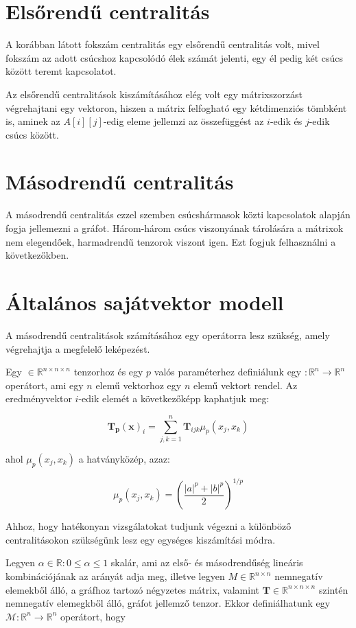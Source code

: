 \documentclass[12pt,numbers=noenddot]{report}
\begin{document}
\section{Elsőrendű centralitás}

A korábban látott fokszám centralitás egy elsőrendű centralitás volt,
mivel fokszám az adott csúcshoz kapcsolódó élek számát jelenti,
egy él pedig két csúcs között teremt kapcsolatot. 

Az elsőrendű centralitások kiszámításához elég volt egy mátrixszorzást 
végrehajtani egy vektoron, hiszen a mátrix felfogható egy kétdimenziós tömbként
is, aminek az $A[i][j]$-edig eleme jellemzi az összefüggést az $i$-edik és 
$j$-edik csúcs között.


\section{Másodrendű centralitás}

A másodrendű centralitás ezzel szemben csúcshármasok közti kapcsolatok alapján 
fogja jellemezni a gráfot. Három-három csúcs viszonyának tárolására a mátrixok 
nem elegendőek, harmadrendű tenzorok viszont igen.
Ezt fogjuk felhasználni a következőkben.


\section{Általános sajátvektor modell}

A másodrendű centralitások számításához egy operátorra lesz szükség, 
amely végrehajtja a megfelelő leképezést.

Egy \unboldmath $\in \mathbb{R}^{n \times n \times n}$ 
tenzorhoz és egy $p$ valós paraméterhez definiálunk egy 
\unboldmath $: \mathbb{R}^n \rightarrow \mathbb{R}^n$ operátort,
ami egy $n$ elemű vektorhoz egy $n$ elemű vektort rendel. 
Az eredményvektor $i$-edik elemét a következőképp kaphatjuk meg:

$$\boldsymbol{T_p}(\boldsymbol{x})_i = \sum_{j,k=1}^n \boldsymbol{T}_{ijk} 
\mu_p(x_j,x_k)$$

ahol $\mu_p(x_j,x_k)$ a hatványközép, azaz:

$$\mu_p(x_j,x_k) = \left(\frac{|a|^p+|b|^p}{2}\right)^{1/p}$$


Ahhoz, hogy hatékonyan vizsgálatokat tudjunk végezni a különböző 
centralitásokon szükségünk lesz egy egységes kiszámítási módra.

Legyen $\alpha \in \mathbb{R}: 0 \leq \alpha \leq 1$ skalár, ami az első- 
és másodrendűség lineáris kombinációjának az arányát adja meg,
illetve legyen $M \in \mathbb{R}^{n \times n}$ nemnegatív elemekből álló, 
a gráfhoz tartozó négyzetes mátrix, valamint $\boldsymbol{T} \in 
\mathbb{R}^{n \times n \times n}$ szintén nemnegatív elemegkből álló, 
gráfot jellemző tenzor. Ekkor definiálhatunk egy $\mathcal{M}: 
\mathbb{R}^n \rightarrow \mathbb{R}^n$ operátort, hogy
\end{document}
